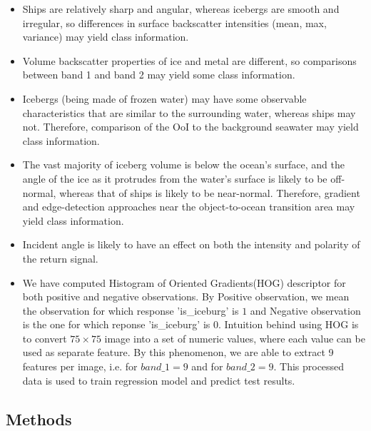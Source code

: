 \documentclass[fleqn,10pt]{SelfArx} %
\begin{document}
\begin{itemize}
	\item Ships are relatively sharp and angular, whereas icebergs are smooth and irregular, so differences in surface backscatter intensities (mean, max, variance) may yield class information.
	\item Volume backscatter properties of ice and metal \cite{howell} are different, so comparisons between band 1 and band 2 may yield some class information.  
	\item Icebergs (being made of frozen water) may have some observable characteristics that are similar to the surrounding water, whereas ships may not.  Therefore, comparison of the OoI to the background seawater may yield class information.
	\item The vast majority of iceberg volume is below the ocean's surface, and the angle of the ice as it protrudes from the water's surface is likely to be off-normal, whereas that of ships is likely to be near-normal.  Therefore, gradient and edge-detection approaches near the object-to-ocean transition area may yield class information.
	\item Incident angle is likely to have an effect on both the intensity and polarity of the return signal. \cite{makynen}
	\item We have computed Histogram of Oriented Gradients(HOG) descriptor for both positive and negative observations. By Positive observation, we mean the observation for which response 'is\_iceburg' is $1$ and Negative observation is the one for which reponse 'is\_iceburg' is $0$. Intuition behind using HOG is to convert $75\times75$ image into a set of numeric values, where each value can be used as separate feature. By this phenomenon, we are able to extract 9 features per image, i.e. for $band\_1 = 9$ and for $band\_2 = 9$. This processed data is used to train regression model and predict test results. 
\end{itemize}

\subsection{Methods}
\end{document}
